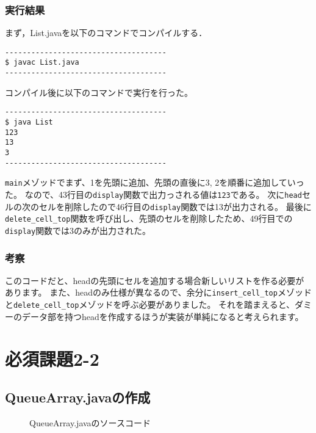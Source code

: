 \documentclass[10.5pt,a4paper]{jsarticle}
\begin{document}
\subsubsection{実行結果}\label{sec:ls_code_exec}

まず，List.javaを以下のコマンドでコンパイルする．

\begin{verbatim}
-------------------------------------
$ javac List.java
-------------------------------------
\end{verbatim}
コンパイル後に以下のコマンドで実行を行った。
\begin{verbatim}
-------------------------------------
$ java List
123
13
3
-------------------------------------
\end{verbatim}

\texttt{main}メゾッドでまず、1を先頭に追加、先頭の直後に3, 2を順番に追加していった。
なので、43行目の\texttt{display}関数で出力っされる値は\texttt{123}である。
次に\texttt{head}セルの次のセルを削除したので46行目の\texttt{display}関数では13が出力される。
最後に\texttt{delete\_cell\_top}関数を呼び出し、先頭のセルを削除したため、49行目での\texttt{display}関数では3のみが出力された。

\subsubsection{考察}

このコードだと、headの先頭にセルを追加する場合新しいリストを作る必要があります。
また、headのみ仕様が異なるので、余分に\texttt{insert\_cell\_top}メゾッドと\texttt{delete\_cell\_top}メゾッドを呼ぶ必要がありました。
それを踏まえると、ダミーのデータ部を持つheadを作成するほうが実装が単純になると考えられます。

\section{必須課題2-2}

\subsection{QueueArray.javaの作成}

\begin{figure}[t]
  \begin{center}
   
   \caption{QueueArray.javaのソースコード}
   \label{code:QueueArray}
  \end{center}
\end{figure}
\end{document}
